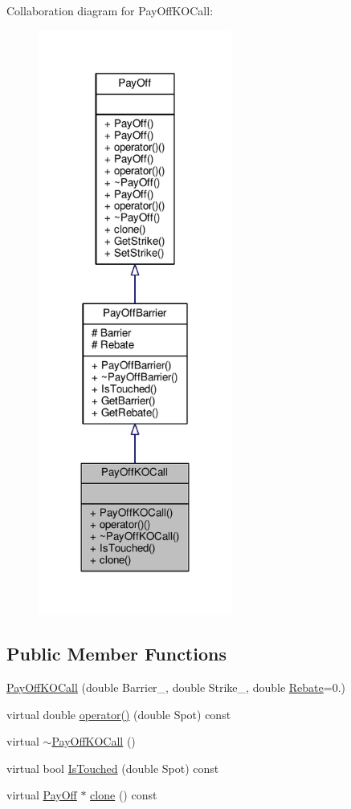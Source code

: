 Collaboration diagram for Pay\+Off\+K\+O\+Call\+:
\nopagebreak
\begin{figure}[H]
\begin{center}
\leavevmode
\includegraphics[width=180pt]{classPayOffKOCall__coll__graph}
\end{center}
\end{figure}
\subsection*{Public Member Functions}
\begin{DoxyCompactItemize}
\item 
\hyperlink{classPayOffKOCall_a403c74f7aa9a08b9dfcd63abc04d0d69}{Pay\+Off\+K\+O\+Call} (double Barrier\+\_\+, double Strike\+\_\+, double \hyperlink{classPayOffBarrier_aca3ea631dcdb28a1df971b74774e41f8}{Rebate}=0.)
\item 
virtual double \hyperlink{classPayOffKOCall_ae147980a5239924341f9f19ab8ac0ee1}{operator()} (double Spot) const
\item 
virtual \hyperlink{classPayOffKOCall_a5493ec945a712131e2067914e0401abc}{$\sim$\+Pay\+Off\+K\+O\+Call} ()
\item 
virtual bool \hyperlink{classPayOffKOCall_aa67fba615a4a0d6272bfc5f7c5604bd0}{Is\+Touched} (double Spot) const
\item 
virtual \hyperlink{classPayOff}{Pay\+Off} $\ast$ \hyperlink{classPayOffKOCall_ae54e9d15a598a2ec7ef2b68712a70009}{clone} () const
\end{DoxyCompactItemize}
